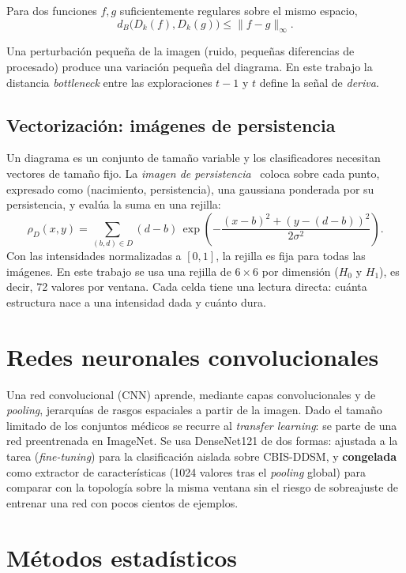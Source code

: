 \begin{teorema}
Para dos funciones $f, g$ suficientemente regulares sobre el mismo espacio,
\[
  d_B\bigl(D_k(f), D_k(g)\bigr) \le \lVert f - g \rVert_\infty .
\]
\end{teorema}

Una perturbación pequeña de la imagen (ruido, pequeñas diferencias de
procesado) produce una variación pequeña del diagrama. En este trabajo la
distancia \textit{bottleneck} entre las exploraciones $t-1$ y $t$ define la
señal de \emph{deriva}.

\subsection{Vectorización: imágenes de persistencia}
Un diagrama es un conjunto de tamaño variable y los clasificadores necesitan
vectores de tamaño fijo. La \emph{imagen de persistencia}~\cite{adams2017persistence}
coloca sobre cada punto, expresado como (nacimiento, persistencia), una
gaussiana ponderada por su persistencia, y evalúa la suma en una rejilla:
\[
  \rho_D(x, y) = \sum_{(b, d) \in D} (d - b)\,
  \exp\!\left(-\frac{(x - b)^2 + (y - (d - b))^2}{2\sigma^2}\right).
\]
Con las intensidades normalizadas a $[0, 1]$, la rejilla es fija para todas
las imágenes. En este trabajo se usa una rejilla de $6\times6$ por dimensión
($H_0$ y $H_1$), es decir, 72 valores por ventana. Cada celda tiene una
lectura directa: cuánta estructura nace a una intensidad dada y cuánto dura.

\section{Redes neuronales convolucionales}
Una red convolucional (CNN) aprende, mediante capas convolucionales y de
\textit{pooling}, jerarquías de rasgos espaciales a partir de la imagen. Dado
el tamaño limitado de los conjuntos médicos se recurre al \textit{transfer
learning}: se parte de una red preentrenada en ImageNet. Se usa DenseNet121 de
dos formas: ajustada a la tarea (\textit{fine-tuning}) para la clasificación
aislada sobre CBIS-DDSM, y \textbf{congelada} como extractor de
características (1024 valores tras el \textit{pooling} global) para comparar
con la topología sobre la misma ventana sin el riesgo de sobreajuste de
entrenar una red con pocos cientos de ejemplos.

\section{Métodos estadísticos}
\label{sec:fundamentos-estadistica}

